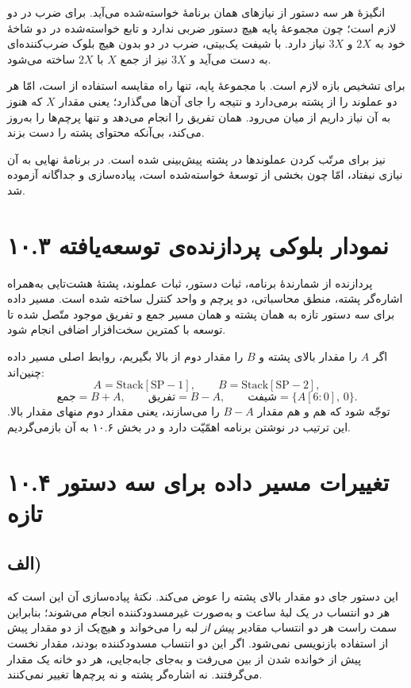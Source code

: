 \documentclass[12pt,a4paper]{article}
\begin{document}
	انگیزهٔ هر سه دستور از نیازهای همان برنامهٔ خواسته‌شده می‌آید.  برای ضرب در دو لازم است؛ چون مجموعهٔ پایه هیچ دستور ضربی ندارد و تابع خواسته‌شده در دو شاخهٔ خود به \(2X\) و \(3X\) نیاز دارد. با شیفت یک‌بیتی، ضرب در دو بدون هیچ بلوک ضرب‌کننده‌ای به دست می‌آید و \(3X\) نیز از جمع \(X\) با \(2X\) ساخته می‌شود.

	 برای تشخیص بازه لازم است. با مجموعهٔ پایه، تنها راه مقایسه استفاده از  است، امّا  هر دو عملوند را از پشته برمی‌دارد و نتیجه را جای آن‌ها می‌گذارد؛ یعنی مقدار \(X\) که هنوز به آن نیاز داریم از میان می‌رود.  همان تفریق را انجام می‌دهد و تنها پرچم‌ها را به‌روز می‌کند، بی‌آنکه محتوای پشته را دست بزند.

	 نیز برای مرتّب کردن عملوندها در پشته پیش‌بینی شده است. در برنامهٔ نهایی به آن نیازی نیفتاد، امّا چون بخشی از توسعهٔ خواسته‌شده است، پیاده‌سازی و جداگانه آزموده شد.

	\section*{۱۰.۳ نمودار بلوکی پردازنده‌ی توسعه‌یافته}
	پردازنده از شمارندهٔ برنامه، ثبات دستور، ثبات عملوند، پشتهٔ هشت‌تایی به‌همراه اشاره‌گر پشته، منطق محاسباتی، دو پرچم و واحد کنترل ساخته شده است. مسیر داده برای سه دستور تازه به همان پشته و همان مسیر جمع و تفریق موجود متّصل شده تا توسعه با کمترین سخت‌افزار اضافی انجام شود.


	اگر \(A\) را مقدار بالای پشته و \(B\) را مقدار دوم از بالا بگیریم، روابط اصلی مسیر داده چنین‌اند:
	\[
	A = \mathrm{Stack}[\mathrm{SP}-1], \qquad B = \mathrm{Stack}[\mathrm{SP}-2],
	\]
	\[
	\text{جمع} = B + A, \qquad
	\text{تفریق} = B - A, \qquad
	\text{شیفت} = \{A[6{:}0],\,0\}.
	\]
	توجّه شود که هم  و هم  مقدار \(B-A\) را می‌سازند، یعنی مقدار دوم منهای مقدار بالا. این ترتیب در نوشتن برنامه اهمّیّت دارد و در بخش ۱۰.۶ به آن بازمی‌گردیم.

	\section*{۱۰.۴ تغییرات مسیر داده برای سه دستور تازه}

	\subsection*{الف) }
	این دستور جای دو مقدار بالای پشته را عوض می‌کند. نکتهٔ پیاده‌سازی آن این است که هر دو انتساب در یک لبهٔ ساعت و به‌صورت غیرمسدودکننده انجام می‌شوند؛ بنابراین سمت راست هر دو انتساب مقادیر \emph{پیش از} لبه را می‌خواند و هیچ‌یک از دو مقدار پیش از استفاده بازنویسی نمی‌شود. اگر این دو انتساب مسدودکننده بودند، مقدار نخست پیش از خوانده شدن از بین می‌رفت و به‌جای جابه‌جایی، هر دو خانه یک مقدار می‌گرفتند. نه اشاره‌گر پشته و نه پرچم‌ها تغییر نمی‌کنند.
\end{document}

